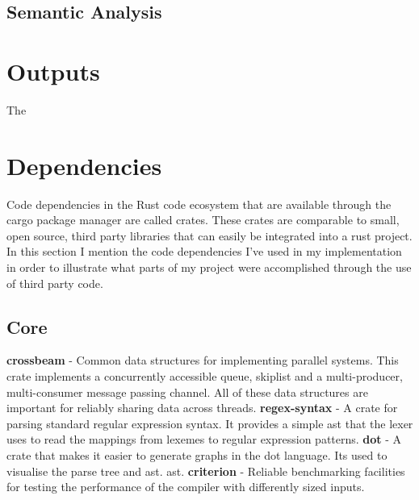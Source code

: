 \subsection{Semantic Analysis}

\section{Outputs} \label{outputs_and_visualizations}

The

\section{Dependencies} \label{dependancies}

Code dependencies in the Rust code ecosystem that are  available through the cargo package manager
are called crates. These crates are comparable to small, open source, third party libraries that can
easily be integrated into a rust project. In this section I mention the code dependencies I've used
in my implementation in order to illustrate what parts of my project were accomplished through the
use of third party code.

\subsection{Core}

\textbf{crossbeam} - Common data structures for implementing parallel systems.
This crate implements a concurrently accessible queue, skiplist and a
multi-producer, multi-consumer message passing channel. All of these data
structures are important for reliably sharing data across threads.
\newline\newline
\textbf{regex-syntax} - A crate for parsing standard regular expression syntax.
It provides a simple \gls{ast} that the lexer uses to read the mappings from
lexemes to regular expression patterns.
\newline\newline
\textbf{dot} - A crate that makes it easier to generate graphs in the dot
language. Its used to visualise the parse tree and \gls{ast}.
\gls{ast}.
\newline\newline
\textbf{criterion} - Reliable benchmarking facilities for testing the performance of the
compiler with differently sized inputs.

